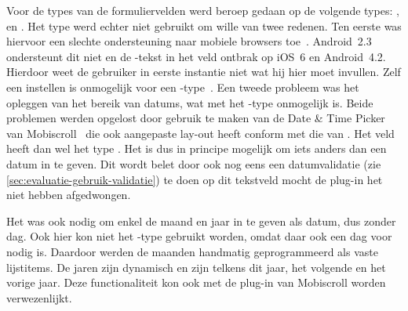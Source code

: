 Voor de types van de formuliervelden werd beroep gedaan op de volgende types: ,  en . 
Het  type werd echter niet gebruikt om wille van twee redenen.
Ten eerste was hiervoor een slechte ondersteuning naar mobiele browsers toe~\cite{Deveria2013b}.
Android~2.3 ondersteunt dit niet en de -tekst in het veld ontbrak op iOS~6 en Android~4.2.
Hierdoor weet de gebruiker in eerste instantie niet wat hij hier moet invullen. 
Zelf een  instellen is onmogelijk voor een -type~\cite{Berjon2012}. 
Een tweede probleem was het opleggen van het bereik van datums, wat met het -type onmogelijk is. 
Beide problemen werden opgelost door gebruik te maken van de Date \& Time Picker van Mobiscroll~\cite{Mobiscroll2013} die ook aangepaste lay-out heeft conform met die van \jqm{}. 
Het veld heeft dan wel het type .
Het is dus in principe mogelijk om iets anders dan een datum in te geven. 
Dit wordt belet door ook nog eens een datumvalidatie (zie \ref{sec:evaluatie-gebruik-validatie}) te doen op dit tekstveld mocht de plug-in het niet hebben afgedwongen.
 
Het was ook nodig om enkel de maand en jaar in te geven als datum, dus zonder dag.
Ook hier kon niet het -type gebruikt worden, omdat daar ook een dag voor nodig is. 
Daardoor werden de maanden handmatig geprogrammeerd als vaste lijstitems. 
De jaren zijn dynamisch en zijn telkens dit jaar, het volgende en het vorige jaar. 
Deze functionaliteit kon ook met de plug-in van Mobiscroll worden verwezenlijkt.

